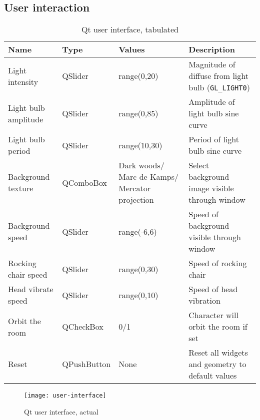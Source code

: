 \documentclass{article}
\begin{document}
		\subsection{User interaction}
		\begin{table}[H]
		\begin{tabularx}{\textwidth}{|l|l|X|X|}
		\hline
		\textbf{Name}        & \textbf{Type} & \textbf{Values}                                & \textbf{Description}                             \\ \hline
		Light intensity      & QSlider       & range(0,20)                                    & Magnitude of diffuse from light bulb (\texttt{GL\_LIGHT0})\\ \hline
		Light bulb amplitude & QSlider       & range(0,85)                                    & Amplitude of light bulb sine curve               \\ \hline
		Light bulb period    & QSlider       & range(10,30)                                   & Period of light bulb sine curve                  \\ \hline
		Background texture   & QComboBox     & Dark woods/ Marc de Kamps/ Mercator projection & Select background image visible through window   \\ \hline
		Background speed     & QSlider       & range(-6,6)                                    & Speed of background visible through window       \\ \hline
		Rocking chair speed  & QSlider       & range(0,30)                                    & Speed of rocking chair                           \\ \hline
		Head vibrate speed   & QSlider       & range(0,10)                                    & Speed of head vibration                          \\ \hline
		Orbit the room       & QCheckBox     & 0/1                                            & Character will orbit the room if set             \\ \hline
		Reset                & QPushButton   & None                                           & Reset all widgets and geometry to default values \\ \hline
		\end{tabularx}
		\caption{Qt user interface, tabulated}
		\label{ui-table}
		\end{table}

		\begin{figure}[htbp]
			\centering	
			\texttt{[image: user-interface]}
			\caption{Qt user interface, actual}
			\label{ui-actual}
		\end{figure}
		
\end{document}

